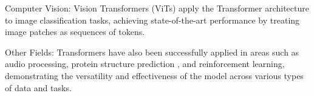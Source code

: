 \par{Computer Vision:} Vision Transformers (ViTs) \cite{dosovitskiy2020image} apply the Transformer architecture to image classification tasks, achieving state-of-the-art performance by treating image patches as sequences of tokens.

\par{Other Fields:} Transformers have also been successfully applied in areas such as audio processing, protein structure prediction \cite{jumper2021highly}, and reinforcement learning, demonstrating the versatility and effectiveness of the model across various types of data and tasks.

